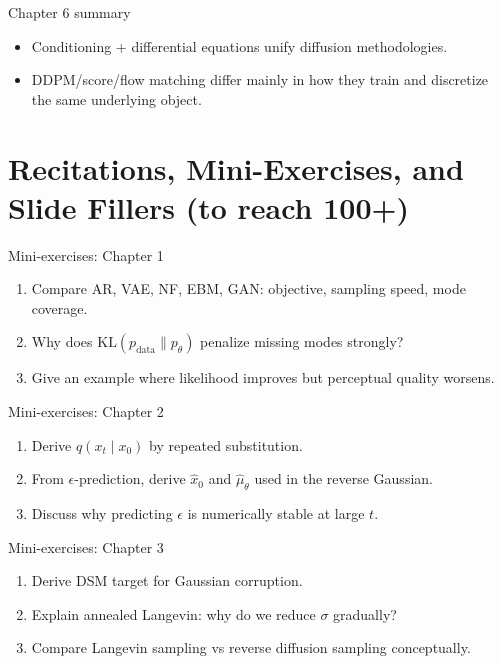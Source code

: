 \documentclass[aspectratio=169]{beamer}
\begin{document}
\begin{frame}{Chapter 6 summary}
\begin{itemize}
\item Conditioning + differential equations unify diffusion methodologies.
\item DDPM/score/flow matching differ mainly in how they train and discretize the same underlying object.
\end{itemize}
\end{frame}

\section{Recitations, Mini-Exercises, and Slide Fillers (to reach 100+)}

\begin{frame}{Mini-exercises: Chapter 1}
\begin{enumerate}
\item Compare AR, VAE, NF, EBM, GAN: objective, sampling speed, mode coverage.
\item Why does \(\mathrm{KL}(p_{\text{data}}\|p_\theta)\) penalize missing modes strongly?
\item Give an example where likelihood improves but perceptual quality worsens.
\end{enumerate}
\end{frame}

\begin{frame}{Mini-exercises: Chapter 2}
\begin{enumerate}
\item Derive \(q(x_t\mid x_0)\) by repeated substitution.
\item From \(\epsilon\)-prediction, derive \(\hat x_0\) and \(\hat\mu_\theta\) used in the reverse Gaussian.
\item Discuss why predicting \(\epsilon\) is numerically stable at large \(t\).
\end{enumerate}
\end{frame}

\begin{frame}{Mini-exercises: Chapter 3}
\begin{enumerate}
\item Derive DSM target for Gaussian corruption.
\item Explain annealed Langevin: why do we reduce \(\sigma\) gradually?
\item Compare Langevin sampling vs reverse diffusion sampling conceptually.
\end{enumerate}
\end{frame}
\end{document}
